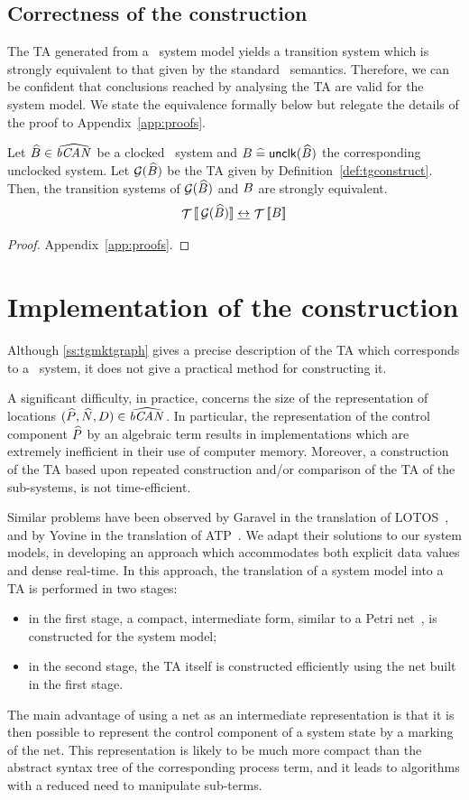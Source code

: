 \subsection{Correctness of the construction}\label{ss:tgcorrect}
The TA generated from a \bcandle\ system model yields a transition system
which is strongly equivalent to that given by the standard \bcandle\ semantics.
Therefore, we can be confident that conclusions reached by analysing the
TA are valid for the system model. We state 
the equivalence formally below but relegate the details of the proof to 
Appendix~\ref{app:proofs}.
\begin{proposition}\label{prop:tgcorrect}
Let ${\widehat{{B}}} \in {\widehat{{\text{\it bCAN\/}_{}}}}$ be a clocked \bcandle\ system and
${B} \mathrel{\widehat=} {\mathop{{\sf unclk}}}({\widehat{{B}}})$ the corresponding unclocked system.
Let $\Gr(\csys)$ be the TA given by 
Definition~\ref{def:tgconstruct}. Then, the transition systems
of $\Gr(\csys)$ and ${B}$ are strongly equivalent.
\[
\TSys{\Gr(\csys)} \bisim \TSys{\sys}
\]
\end{proposition}
\begin{proof}
Appendix~\ref{app:proofs}.
\end{proof}

\section{Implementation of the construction \label{sec:tggraphimpl}}
Although \Sec\ref{ss:tgmktgraph} gives a precise description of the TA
which corresponds to a \bcandle\ system, it does not give a practical
method for constructing it. 

A significant difficulty, in practice, concerns the size of the
representation of locations $({\widehat{P}},{\widehat{N}},{D}) \in {\widehat{{\text{\it bCAN\/}_{}}}}$. In particular,
the representation of the control component ${\widehat{P}}$ by an algebraic term
results in implementations which are extremely inefficient in their
use of computer memory. Moreover, a construction of the TA based upon
repeated construction and/or comparison of the TA of the sub-systems,
is not time-efficient.

Similar problems have been observed by Garavel in the translation of
LOTOS~\cite{gar:92}, and by Yovine in the translation of
ATP~\cite{yov:93}. We adapt their solutions to our system models, in
developing an approach which accommodates both explicit data values
and dense real-time.  In this approach, the translation of a system
model into a TA is performed in two stages:
\begin{itemize}
\item in the first stage, a compact, intermediate form, similar to a Petri 
net~\cite{mur:89}, is constructed for the system model;
\item in the second stage, the TA itself is constructed efficiently 
using the net built in the first stage.
\end{itemize}
The main advantage of using a net as an intermediate representation is
that it is then possible to represent the control component of a system
state by a marking of the net. This representation is likely to be
much more compact than the abstract syntax tree of the corresponding
process term, and it leads to algorithms with a reduced need to
manipulate sub-terms.

